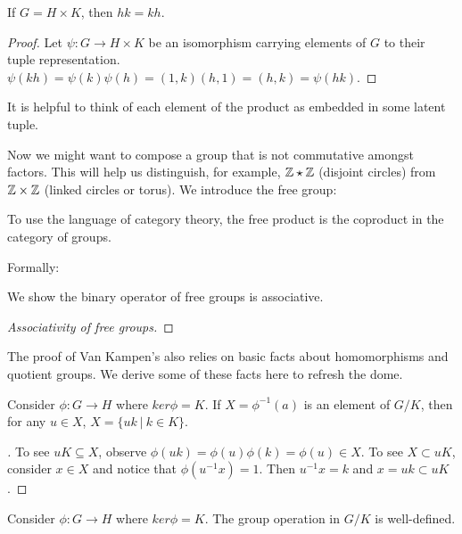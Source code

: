 \documentclass[10pt]{article}
\begin{document}

\begin{proposition} 
	If $G = H \times K$, then $hk = kh$.
\end{proposition}

\begin{proof}
	Let $\psi: G \to H \times K$ be an isomorphism carrying elements of $G$ to their tuple representation. $\psi(kh) = \psi(k)\psi(h) = (1, k)(h, 1) = (h, k) = \psi(hk).$
\end{proof}

It is helpful to think of each element of the product as embedded in some latent tuple. 

Now we might want to compose a group that is not commutative amongst factors. This will help us distinguish, for example, $\mathbb{Z} \star \mathbb{Z}$ (disjoint circles) from $\mathbb{Z} \times \mathbb{Z}$ (linked circles or torus). We introduce the free group:

To use the language of category theory, the free product is the coproduct in the category of groups.

Formally:

We show the binary operator of free groups is associative.

\begin{proof}[Associativity of free groups]

\end{proof}

The proof of Van Kampen's also relies on basic facts about homomorphisms and quotient groups. We derive some of these facts here to refresh the dome.

\begin{proposition}[]
	Consider $\phi: G \to H$ where $ker \phi = K$. If $X = \phi^{-1}(a)$ is an element of $G / K$, then for any $u \in X$, $X = \{ uk ~|~ k \in K \}$.
\end{proposition}

\begin{proof}[]
	To see $uK \subseteq X$, observe $\phi(uk) = \phi(u)\phi(k) = \phi(u) \in X$. To see $X \subset uK$, consider $x \in X$ and notice that $\phi(u^{-1}x) = 1$. Then $u^{-1}x = k$ and $x = uk \subset uK$.
\end{proof}

\begin{proposition}[]
	Consider $\phi: G \to H$ where $ker \phi = K$. The group operation in $G / K$ is well-defined.
\end{proposition}
\end{document}
